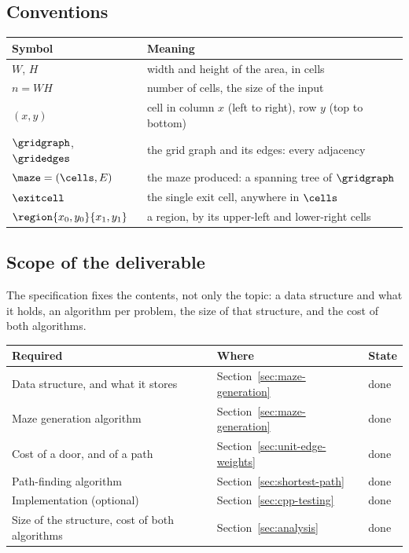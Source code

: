 \subsection{Conventions}

\begin{center}
\begin{tabular}{@{}ll@{}}
  \toprule
  Symbol & Meaning \\
  \midrule
  $W$, $H$            & width and height of the area, in cells \\
  $n=WH$              & number of cells, the size of the input \\
  $(x,y)$             & cell in column $x$ (left to right), row $y$ (top to bottom) \\
  $\gridgraph$, $\gridedges$ & the grid graph and its edges: every adjacency \\
  $\maze=(\cells,E)$  & the maze produced: a spanning tree of $\gridgraph$ \\
  $\exitcell$         & the single exit cell, anywhere in $\cells$ \\
  $\region{x_0,y_0}{x_1,y_1}$ & a region, by its upper-left and lower-right cells \\
  \bottomrule
\end{tabular}
\end{center}

\subsection{Scope of the deliverable}

The specification fixes the contents, not only the topic: a data structure and
what it holds, an algorithm per problem, the size of that structure, and the
cost of both algorithms.

\begin{center}
\begin{tabular}{@{}lll@{}}
  \toprule
  Required & Where & State \\
  \midrule
  Data structure, and what it stores & Section~\ref{sec:maze-generation} & done \\
  Maze generation algorithm          & Section~\ref{sec:maze-generation} & done \\
  Cost of a door, and of a path      & Section~\ref{sec:unit-edge-weights} & done \\
  Path-finding algorithm             & Section~\ref{sec:shortest-path} & done \\
  Implementation (optional)          & Section~\ref{sec:cpp-testing} & done \\
  Size of the structure, cost of both algorithms & Section~\ref{sec:analysis} & done \\
  \bottomrule
\end{tabular}
\end{center}
